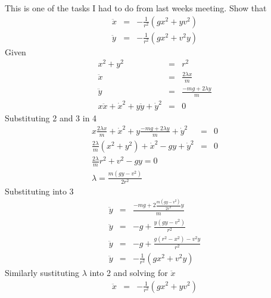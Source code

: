 \documentclass[12pt]{report}
\begin{document}
\date{\today}
This is one of the tasks I had to do from last weeks meeting. Show that
\begin{eqnarray*} 
    \ddot{x} &=& -\frac{1}{r^2}\left(gx^2 + yv^2\right)\\
    \ddot{y} &=& -\frac{1}{r^2}\left(gx^2 + v^2y\right)
\end{eqnarray*} 
Given
\begin{eqnarray}
    x^2 + y^2 &=& r^2\\
    \ddot{x} &=& \frac{2\lambda x}{m}\\
    \ddot{y} &=& \frac{-mg + 2\lambda y}{m}\\
    x\ddot{x} + \dot{x}^2 + y\ddot{y} + \dot{y}^2 &=& 0
\end{eqnarray}
Substituting 2 and 3 in 4
\begin{eqnarray*}
    x\frac{2\lambda x}{m} + \dot{x}^2 + y\frac{-mg + 2\lambda y}{m} + \dot{y}^2
    &=& 0\\
    \frac{2\lambda}{m}(x^2 + y^2) + \dot{x}^2 - gy + \dot{y}^2 &=& 0\\
    \frac{2\lambda}{m}r^2 + v^2 - gy = 0\\
    \lambda = \frac{m(gy - v^2)}{2r^2}
\end{eqnarray*}
Substituting into 3
\begin{eqnarray*}
    \ddot{y} &=& \frac{-mg + 2\frac{m(gy - v^2)}{2r^2} y}{m}\\
    \ddot{y} &=& -g + \frac{y\left(gy - v^2\right)}{r^2}\\
    \ddot{y} &=& -g + \frac{g\left(r^2 - x^2\right) - v^2y}{r^2}\\
    \ddot{y} &=& -\frac{1}{r^2}\left(gx^2 + v^2y\right)
\end{eqnarray*}
Similarly sustituting $\lambda$ into 2 and solving for $\ddot{x}$
\begin{eqnarray*}
    \ddot{x} &=& -\frac{1}{r^2}\left(gx^2 + yv^2\right)
\end{eqnarray*}
\end{document}
